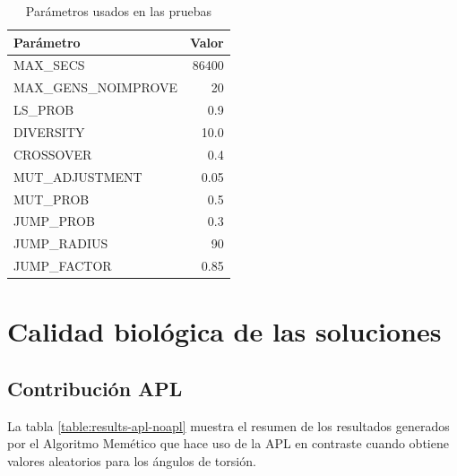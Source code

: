 \begin{table}[h]
	\centering
	\caption{Parámetros usados en las pruebas}
	\begin{tabular}{|l|r|}
		\hline
		Parámetro & Valor \\ \hline
		MAX\_SECS 	& 86400		\\		
		MAX\_GENS\_NOIMPROVE 	& 20		\\ 		
		LS\_PROB 	& 0.9		\\  	
		DIVERSITY 	& 10.0		\\ 		
		CROSSOVER 	& 0.4		\\ 		
		MUT\_ADJUSTMENT 	& 0.05		\\ 		
		MUT\_PROB 	& 0.5		\\		
		JUMP\_PROB 	& 0.3		\\		
		JUMP\_RADIUS 	& 90		\\		
		JUMP\_FACTOR 	& 0.85		\\	\hline	
	\end{tabular}
	\label{table:lista-valores-parametros}
\end{table}

\section{Calidad biológica de las soluciones}

\subsection{Contribución APL}

La tabla \ref{table:results-apl-noapl} muestra el resumen de los resultados generados por el Algoritmo Memético que hace uso de la APL en contraste cuando obtiene valores aleatorios para los ángulos de torsión.


